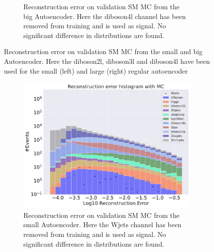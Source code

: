 \begin{figure}[h!]
\begin{subfigure}{.45\textwidth}
        \caption{Reconstruction error on validation SM MC from the big Autoencoder. Here the diboson4l channel has been removed from training and 
        is used as signal. No significant difference in distributions are found. }
        \label{fig:ae_big_diboson4l}
    \end{subfigure}
    \hfill  
    \caption[Channel removal, diboson2l, diboson3l, diboson4l]{Reconstruction error on validation SM MC from the small and big Autoencoder. Here the diboson2l, diboson3l and diboson4l have been used for the
    small (left) and large (right) regular autoencoder}
    \label{fig:ae_big_channel3}
\end{figure}


\begin{figure}[h!]
    \centering
    \begin{subfigure}{.45\textwidth}
        \includegraphics[width=\textwidth]{Figures/AE_testing/small/b_data_recon_big_rm3_feats_sig_Wjets.pdf}
        \caption{Reconstruction error on validation SM MC from the small Autoencoder. Here the Wjets channel has been removed from training and 
        is used as signal. No significant difference in distributions are found.}
        \label{fig:ae_small_Wjets}
    \end{subfigure}
    \hfill 
    \begin{subfigure}{.45\textwidth}

\end{subfigure}
\end{figure}
